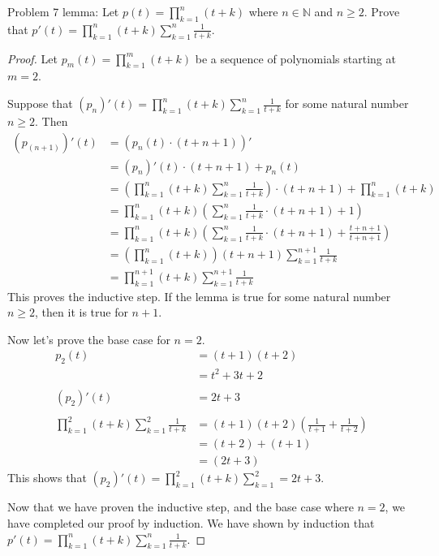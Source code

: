 \usepackage{amsthm}

Problem 7 lemma: Let $\displaystyle p(t) = \prod_{k=1}^{n} (t+k)$ where $n \in \mathbb{N}$ and $n \geq 2$. Prove that $\displaystyle p'(t) = \prod_{k=1}^{n} (t+k) \sum_{k=1}^{n} \frac{1}{t + k}$.

\begin{proof}
Let $\displaystyle p_{m}(t) = \prod_{k=1}^{m} (t+k)$ be a sequence of polynomials starting at $m = 2$. 

Suppose that $\displaystyle (p_{n})'(t) = \prod_{k=1}^{n} (t+k) \sum_{k=1}^{n} \frac{1}{t + k}$ for some natural number $n \geq 2$. Then
\begin{align*}
(p_{(n+1)})'(t) &= \left( p_{n}(t) \cdot (t + n + 1) \right)' \\
&= (p_{n})'(t) \cdot (t + n + 1) + p_{n}(t) \\
&= \left( \prod_{k=1}^{n} (t+k) \sum_{k=1}^{n} \frac{1}{t + k} \right) \cdot (t + n + 1) + \prod_{k=1}^{n} (t+k) \\
&= \prod_{k=1}^{n} (t+k) \left( \sum_{k=1}^{n} \frac{1}{t + k} \cdot (t + n + 1) + 1 \right) \\
&= \prod_{k=1}^{n} (t+k) \left( \sum_{k=1}^{n} \frac{1}{t + k} \cdot (t + n + 1) + \frac{t + n + 1}{t + n + 1} \right) \\
&= \left( \prod_{k=1}^{n} (t+k) \right) (t + n + 1) \sum_{k=1}^{n+1} \frac{1}{t + k} \\
&= \prod_{k=1}^{n+1} (t+k) \sum_{k=1}^{n+1} \frac{1}{t + k}
\end{align*}
This proves the inductive step. If the lemma is true for some natural number $n \geq 2$, then it is true for $n + 1$.

Now let's prove the base case for $n = 2$.
\begin{align*}
p_{2}(t) &= (t + 1)(t + 2) \\
&= t^2 + 3t + 2 \\ \\
(p_{2})'(t) &= 2t + 3 \\ \\
\prod_{k=1}^{2} (t+k) \sum_{k=1}^{2} \frac{1}{t + k} &= (t + 1)(t + 2)\left(\frac{1}{t + 1} + \frac{1}{t + 2}\right) \\
&= (t + 2) + (t + 1) \\
&= (2t + 3)
\end{align*}
This shows that $\displaystyle (p_{2})'(t) = \prod_{k=1}^{2} (t+k) \sum_{k=1}^{2} = 2t + 3$.

Now that we have proven the inductive step, and the base case where $n = 2$, we have completed our proof by induction. We have shown by induction that $\displaystyle p'(t) = \prod_{k=1}^{n} (t+k) \sum_{k=1}^{n} \frac{1}{t + k}$.

\end{proof}
